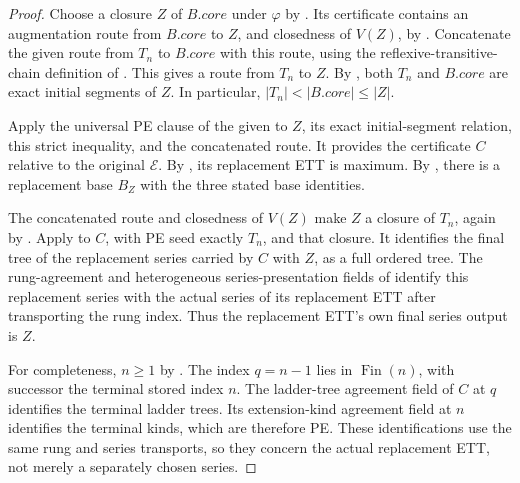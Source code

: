 \begin{proof}
Choose a closure \(Z\) of \(B.\mathit{core}\) under \(\varphi\) by
. Its certificate contains an augmentation
route from \(B.\mathit{core}\) to \(Z\), and closedness of \(V(Z)\), by
. Concatenate the given route from \(T_n\) to
\(B.\mathit{core}\) with this route, using the reflexive-transitive-chain
definition of . This gives a route
from \(T_n\) to \(Z\). By ,
both \(T_n\) and \(B.\mathit{core}\) are exact initial segments of \(Z\).
In particular, \(|T_n|<|B.\mathit{core}|\leq|Z|\).

Apply the universal PE clause of the given  to \(Z\),
its exact initial-segment relation, this strict inequality, and the
concatenated route. It provides the certificate \(C\) relative to the
original \(\mathcal E\). By , its
replacement ETT is maximum. By ,
there is a replacement base \(B_Z\) with the three stated base identities.

The concatenated route and closedness of \(V(Z)\) make \(Z\) a closure
of \(T_n\), again by . Apply
 to \(C\), with PE seed exactly
\(T_n\), and that closure. It identifies the final tree of the replacement
series carried by \(C\) with \(Z\), as a full ordered tree.
The rung-agreement and heterogeneous series-presentation fields of
 identify this replacement
series with the actual series of its replacement ETT after transporting
the rung index. Thus the replacement ETT's own final series output is \(Z\).

For completeness, \(n\geq1\) by .
The index \(q=n-1\) lies in \(\operatorname{Fin}(n)\), with successor
the terminal stored index \(n\). The ladder-tree agreement field of \(C\)
at \(q\) identifies the terminal ladder trees. Its extension-kind agreement
field at \(n\) identifies the terminal kinds, which are therefore PE.
These identifications use the same rung and series transports, so they
concern the actual replacement ETT, not merely a separately chosen series.
\end{proof}
